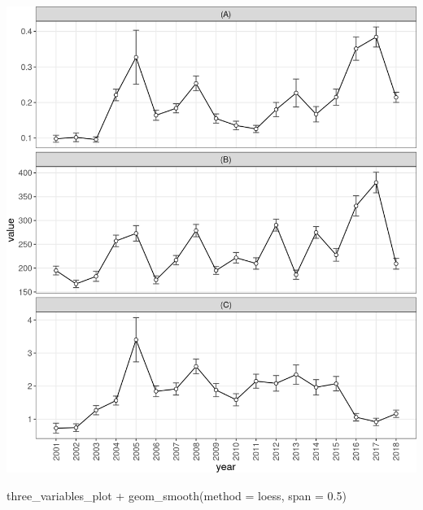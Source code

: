 \documentclass[10pt,landscape,a3paper]{article}
\newenvironment{Shaded}{\begin{snugshade}}{\end{snugshade}}
\newcommand{\AttributeTok}[1]{\textcolor[rgb]{0.77,0.63,0.00}{#1}}
\newcommand{\FloatTok}[1]{\textcolor[rgb]{0.00,0.00,0.81}{#1}}
\newcommand{\FunctionTok}[1]{\textcolor[rgb]{0.00,0.00,0.00}{#1}}
\newcommand{\NormalTok}[1]{#1}
\newcommand{\SpecialCharTok}[1]{\textcolor[rgb]{0.00,0.00,0.00}{#1}}
\newcommand{\StringTok}[1]{\textcolor[rgb]{0.31,0.60,0.02}{#1}}
\begin{document}
\begin{center}\includegraphics{img/modelling/aa-eda-ts-5} \end{center}

\begin{Shaded}
\begin{Highlighting}[]
\NormalTok{three\_variables\_plot }\SpecialCharTok{+} \FunctionTok{geom\_smooth}\NormalTok{(}\AttributeTok{method =} \StringTok{\textquotesingle{}loess\textquotesingle{}}\NormalTok{, }\AttributeTok{span =} \FloatTok{0.5}\NormalTok{)}
\end{Highlighting}
\end{Shaded}
\end{document}
